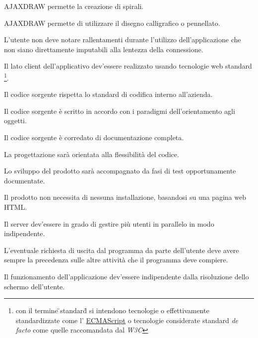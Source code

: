 \begin{elenconumerato}{\subsubsecindent}
\item{AJAXDRAW permette la creazione di spirali.}
\item{AJAXDRAW permette di utilizzare il disegno calligrafico o pennellato.}
\end{elenconumerato}

\begin{elenconumerato}{\subsubsecindent}
\item L'utente non deve notare rallentamenti durante l'utilizzo dell'applicazione che non siano direttamente imputabili alla lentezza della connessione.
\end{elenconumerato}

\begin{elenconumerato}{\subsubsecindent}
\item Il lato client dell'applicativo dev'essere realizzato usando tecnologie web standard
\footnote{con il termine \"{}standard\" {} si intendono tecnologie o effettivamente standardizzate come l'
\underline{ECMAScript} o tecnologie considerate standard \textit{de facto} come quelle raccomandata dal \textit{W3C}}.
\item Il codice sorgente rispetta lo standard di codifica interno all'azienda.
\item Il codice sorgente \`e scritto in accordo con i paradigmi dell'orientamento agli oggetti.
\item Il codice sorgente \`e corredato di documentazione completa.
\item La progettazione sar\`a orientata alla flessibilit\`a del codice.
\item Lo sviluppo del prodotto sar\`a accompagnato da fasi di test opportunamente documentate.
\item Il prodotto non necessita di nessuna installazione, basandosi su una pagina web HTML.
\item Il server dev'essere in grado di gestire pi\`u utenti in parallelo in modo indipendente.
\item L'eventuale richiesta di uscita dal programma da parte dell'utente deve avere sempre la precedenza sulle altre attivit\`a che il programma deve compiere.
\item Il funzionamento dell'applicazione dev'essere indipendente dalla risoluzione dello schermo dell'utente.
\end{elenconumerato}

